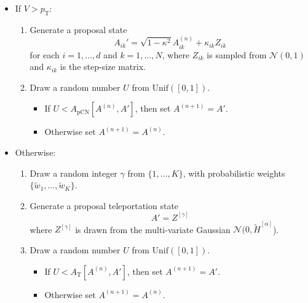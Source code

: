 \begin{enumerate}
\begin{samepage}
		\begin{itemize}
			\item If $V > p_\text{T}$:
				\begin{enumerate}
					\item Generate a proposal state
						\begin{equation} 
							A_{ik}' = \sqrt{1 - \kappa^2} A_{ik}^{(n)} + \kappa_{ik} Z_{ik}
						\end{equation}
						for each $i=1,\dots,d$ and $k = 1,\dots,N$, where $Z_{ik}$ is sampled from $\mathcal{N}(0,1)$ and $\kappa_{ik}$ is the step-size matrix.
					\item Draw a random number $U$ from $\text{Unif}([0,1])$.
						\begin{itemize}
							\item If $U < A_\text{pCN}[A^{(n)}, A']$, then set $A^{(n+1)} = A'$.
							\item Otherwise set $A^{(n+1)} = A^{(n)}$.
						\end{itemize}
				\end{enumerate}
			\item Otherwise:
				\begin{enumerate}
					\item Draw a random integer $\gamma$ from $\{1, \dots, K \}$, with probabilistic weights $\{ \tilde{w}_1, \dots, \tilde{w}_K \}$.
					\item Generate a proposal teleportation state
						\begin{equation}
							A' = Z^{[\gamma]}
						\end{equation}
						where $Z^{[\gamma]}$ is drawn from the multi-variate Gaussian $\mathcal{N}(0, \tilde{H}^{[\alpha]}$).
					\item Draw a random number $U$ from $\text{Unif}([0,1])$.
						\begin{itemize}
							\item If $U < A_\text{T}[A^{(n)}, A']$, then set $A^{(n+1)} = A'$.
							\item Otherwise set $A^{(n+1)} = A^{(n)}$.
						\end{itemize}
				\end{enumerate}
		\end{itemize}
\end{samepage}
\end{enumerate}

